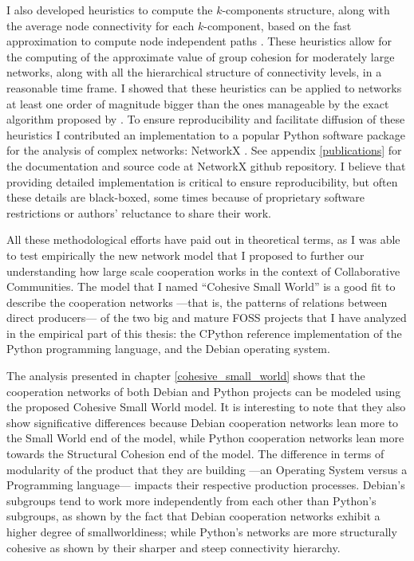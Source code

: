 I also developed heuristics to compute the $k$-components structure, along with the average node connectivity for each $k$-component, based on the fast approximation to compute node independent paths \citep{white:2001b}. These heuristics allow for the computing of the approximate value of group cohesion for moderately large networks, along with all the hierarchical structure of connectivity levels, in a reasonable time frame. I showed that these heuristics can be applied to networks at least one order of magnitude bigger than the ones manageable by the exact algorithm proposed by \citet{moody:2003}. To ensure reproducibility and facilitate diffusion of these heuristics I contributed an implementation to a popular Python software package for the analysis of complex networks: NetworkX \citep{hagberg:2008}. See appendix \ref{publications} for the documentation and source code at NetworkX github repository. I believe that providing detailed implementation is critical to ensure reproducibility, but often these details are black-boxed, some times because of proprietary software restrictions or authors' reluctance to share their work.

All these methodological efforts have paid out in theoretical terms, as I was able to test empirically the new network model that I proposed to further our understanding how large scale cooperation works in the context of Collaborative Communities. The model that I named ``Cohesive Small World'' is a good fit to describe the cooperation networks ---that is, the patterns of relations between direct producers--- of the two big and mature FOSS projects that I have analyzed in the empirical part of this thesis: the CPython reference implementation of the Python programming language, and the Debian operating system.

The analysis presented in chapter \ref{cohesive_small_world} shows that the cooperation networks of both Debian and Python projects can be modeled using the proposed Cohesive Small World model. It is interesting to note that they also show significative differences because Debian cooperation networks lean more to the Small World end of the model, while Python cooperation networks lean more towards the Structural Cohesion end of the model. The difference in terms of modularity of the product that they are building ---an Operating System versus a Programming language--- impacts their respective production processes. Debian's subgroups tend to work more independently from each other than Python's subgroups, as shown by the fact that Debian cooperation networks exhibit a higher degree of smallworldiness; while Python's networks are more structurally cohesive as shown by their sharper and steep connectivity hierarchy.

